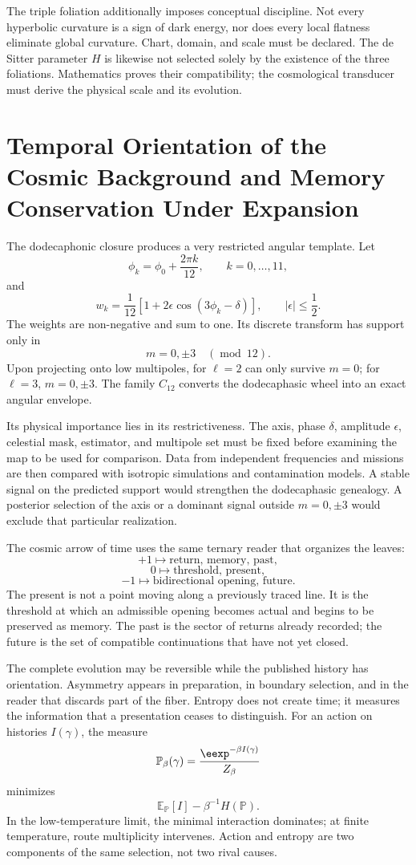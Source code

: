 The triple foliation additionally imposes conceptual discipline. Not every
hyperbolic curvature is a sign of dark energy, nor does every local flatness eliminate
global curvature. Chart, domain, and scale must be declared. The de Sitter parameter
\(H\) is likewise not selected solely by the existence of the three
foliations. Mathematics proves their compatibility; the cosmological transducer must
derive the physical scale and its evolution.

\section{Temporal Orientation of the Cosmic Background and Memory Conservation Under Expansion}

The dodecaphonic closure produces a very restricted angular template. Let
\[
 \phi_k=\phi_0+\frac{2\pi k}{12},
 \qquad k=0,\ldots,11,
\]
and
\[
 w_k
 =
 \frac1{12}
 \left[
 1+2\epsilon\cos(3\phi_k-\delta)
 \right],
 \qquad
 |\epsilon|\leq\frac12.
\]
The weights are non-negative and sum to one. Its discrete transform has support only
in
\[
  m=0,\pm3\quad(\operatorname{mod}\ 12).
\]
Upon projecting onto low multipoles, for \(\ell=2\) can only survive
\(m=0\); for \(\ell=3\), \(m=0,\pm3\). The family \(C_{12}\) converts the dodecaphasic wheel
into an exact angular envelope.

Its physical importance lies in its restrictiveness. The axis, phase \(\delta\),
amplitude \(\epsilon\), celestial mask, estimator, and multipole set
must be fixed before examining the map to be used for comparison. Data from
independent frequencies and missions are then compared with isotropic simulations
and contamination models. A stable signal on the predicted support would strengthen
the dodecaphasic genealogy. A posterior selection of the axis or a dominant signal
outside \(m=0,\pm3\) would exclude that particular realization.

The cosmic arrow of time uses the same ternary reader that organizes the
leaves:
\[
 +1
 \longmapsto
 \text{return, memory, past},
\]
\[
 0
 \longmapsto
 \text{threshold, present},
\]
\[
 -1
 \longmapsto
 \text{bidirectional opening, future}.
\]
The present is not a point moving along a previously traced line. It is
the threshold at which an admissible opening becomes actual and begins to be preserved as
memory. The past is the sector of returns already recorded; the future is the set
of compatible continuations that have not yet closed.

The complete evolution may be reversible while the published history has
orientation. Asymmetry appears in preparation, in boundary selection, and
in the reader that discards part of the fiber. Entropy does not create time; it measures the
information that a presentation ceases to distinguish. For an action on histories
\(I(\gamma)\), the measure
\[
 \mathbb P_\beta(\gamma)
 =
 \frac{\eexp^{-\beta I(\gamma)}}{Z_\beta}
\]
minimizes
\[
 \mathbb E_{\mathbb P}[I]
 -
 \beta^{-1}H(\mathbb P).
\]
In the low-temperature limit, the minimal interaction dominates; at finite
temperature, route multiplicity intervenes. Action and entropy are two
components of the same selection, not two rival causes.

